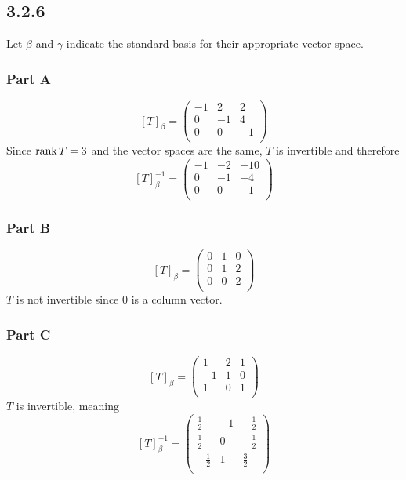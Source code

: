 \documentclass[12pt,titlepage]{extarticle}
\begin{document}
\subsection*{3.2.6}
Let $\beta$ and $\gamma$ indicate the standard basis for their appropriate vector space.

\subsubsection*{Part A}
\[
    [T]_{\beta} = \left(\begin{array}{ccc}-1&2&2\\0&-1&4\\0&0&-1\\\end{array}\right)
\]
Since $\rank T = 3$ and the vector spaces are the same, $T$ is invertible and therefore
\[
    [T]_{\beta}^{-1} = \left(\begin{array}{ccc}-1&-2&-10\\0&-1&-4\\0&0&-1\\\end{array}\right)
\]

\subsubsection*{Part B}
\[
    [T]_{\beta} =\left(\begin{array}{ccc}0&1&0\\0&1&2\\0&0&2\\\end{array}\right)
\]
$T$ is not invertible since $0$ is a column vector.

\subsubsection*{Part C}
\[
    [T]_{\beta} = \left(\begin{array}{ccc}1&2&1\\-1&1&0\\1&0&1\\\end{array}\right)
\]
$T$ is invertible, meaning
\[
    [T]_{\beta}^{-1} = \left(\begin{array}{ccc}\frac{1}{2}&-1&-\frac{1}{2}\\\frac{1}{2}&0&-\frac{1}{2}\\-\frac{1}{2}&1&\frac{3}{2}\\\end{array}\right)
\]
\end{document}
